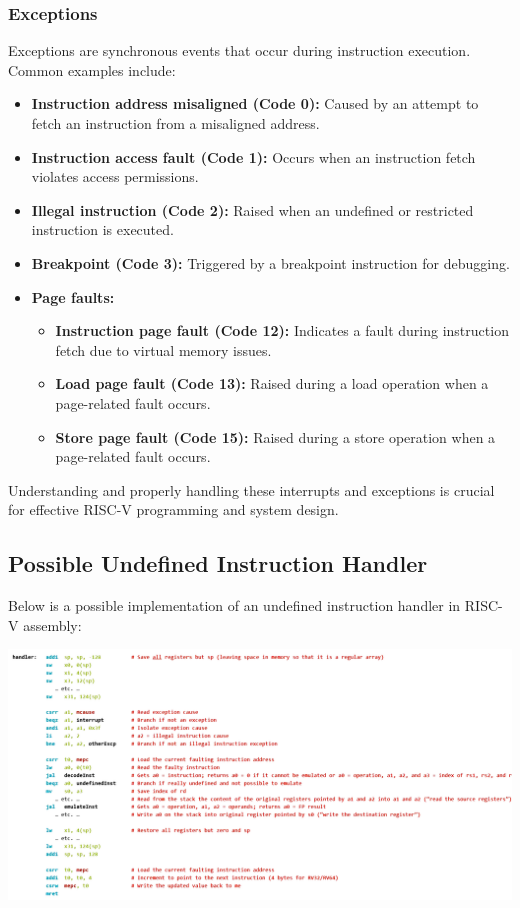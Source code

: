 \subsubsection*{Exceptions}
Exceptions are synchronous events that occur during instruction execution. Common examples include:
\begin{itemize}
    \item \textbf{Instruction address misaligned (Code 0):} Caused by an attempt to fetch an instruction from a misaligned address.
    \item \textbf{Instruction access fault (Code 1):} Occurs when an instruction fetch violates access permissions.
    \item \textbf{Illegal instruction (Code 2):} Raised when an undefined or restricted instruction is executed.
    \item \textbf{Breakpoint (Code 3):} Triggered by a breakpoint instruction for debugging.
    \item \textbf{Page faults:}
    \begin{itemize}
        \item \textbf{Instruction page fault (Code 12):} Indicates a fault during instruction fetch due to virtual memory issues.
        \item \textbf{Load page fault (Code 13):} Raised during a load operation when a page-related fault occurs.
        \item \textbf{Store page fault (Code 15):} Raised during a store operation when a page-related fault occurs.
    \end{itemize}
\end{itemize}

Understanding and properly handling these interrupts and exceptions is crucial for effective RISC-V programming and system design.

\subsection{Possible Undefined Instruction Handler}
Below is a possible implementation of an undefined instruction handler in RISC-V assembly:
\begin{center}
    \includegraphics[width=1\textwidth]{chapters/chapter2d/images/instr_handler.png}
\end{center}


